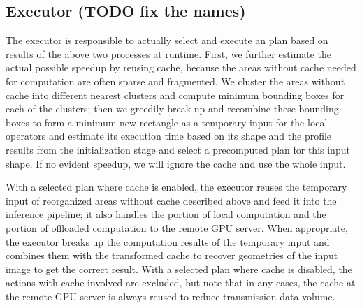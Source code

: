 \subsection{Executor (TODO fix the names)}
The executor is responsible to actually select and execute an plan based on results of the above two processes at runtime.
First, we further estimate the actual possible speedup by reusing cache, because the areas without cache needed for computation are often sparse and fragmented.
We cluster the areas without cache into different nearest clusters and compute minimum bounding boxes for each of the clusters;
then we greedily break up and recombine these bounding boxes to form a minimum new rectangle as a temporary input for the local operators and estimate its execution time based on its shape and the profile results from the initialization stage and select a precomputed plan for this input shape.
If no evident speedup, we will ignore the cache and use the whole input.

With a selected plan where cache is enabled, the executor reuses the temporary input of reorganized areas without cache described above and feed it into the inference pipeline; it also handles the portion of local computation and the portion of offloaded computation to the remote GPU server.
When appropriate, the executor breaks up the computation results of the temporary input and combines them with the transformed cache to recover geometries of the input image to get the correct result.
With a selected plan where cache is disabled, the actions with cache involved are excluded, but note that in any cases, the cache at the remote GPU server is always reused to reduce transmission data volume.









